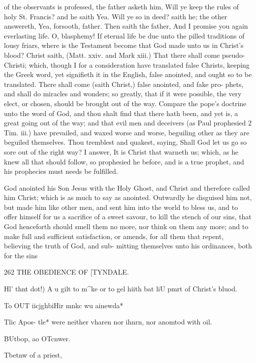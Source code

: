 \documentclass{custom}
\begin{document}
{of the observants is professed, the father asketh him, 
Will ye keep the rules of holy St. Francis? and he saith 
Yea. Will ye so in deed? saith he; the other answereth, 
Yea, forsooth, father. Then saith the father, And I 
promise you again everlasting life. O, blasphemy! If 
eternal life be due unto the pilled traditions of lousy friars, 
where is the Testament become that God made unto us 
in Christ's blood? Christ saith, (Matt. xxiv. and Mark 
xiii.) That there shall come pseudo-Christi; which, 
though I for a consideration have translated false Christs, 
keeping the Greek word, yet signifieth it in the English, 
false anointed, and ought so to be translated. There 
shall come (saith Christ,) false anointed, and fake pro- 
phets, and shall do miracles and wonders; so greatly, that 
if it were possible, the very elect, or chosen, should be 
brought out of the way. Compare the pope's doctrine 
unto the word of God, and thou shalt find that there hath 
been, and yet is, a great going out of the way; and that 
evil men and deceivers (as Paul prophesied 2 Tim. iii.) 
have prevailed, and waxed worse and worse, beguiling 
other as they are beguiled themselves. Thou tremblest 
and quakest, saying, Shall God let us go so sore out of 
the right way? I answer, It is Christ that warneth us; 
which, as he knew all that should follow, so prophesied 
he before, and is a true prophet, and his prophecies must 
needs be fulfilled. 

God anointed his Son Jesus with the Holy Ghost, and Christ and 
therefore called him Christ; which is as much to say as 
anointed. Outwardly he disguised him not, but made 
him like other men, and sent him into the world to bless 
us, and to offer himself for us a sacrifice of a sweet savour, 
to kill the stench of our sins, that God henceforth should 
smell them no more, nor think on them any more; and to 
make full and sufficient satisfaction, or amends, for all 
them that repent, believing the truth of God, and sub- 
mitting themselves unto his ordinances, both for the sins 


262
THE OBEDIENCE OF
[TYNDALE.

Hl' thnt 
dot!) A u gilt 
to m^ke 
or to gel 
hiith bat 
liU pmrt of 
Christ's 
bluod. 

To OUT 
iicjghbiHir 
mnkc wu 
ainewda* 

Tlic Apos- 
tle* were 
neither 
vharen nor 
ihnrn, nor 
anomtod 
with oil. 

BUtbop, ao 
OTcnwer. 

Tbetnw 
of a priest, 

}
\end{document}
